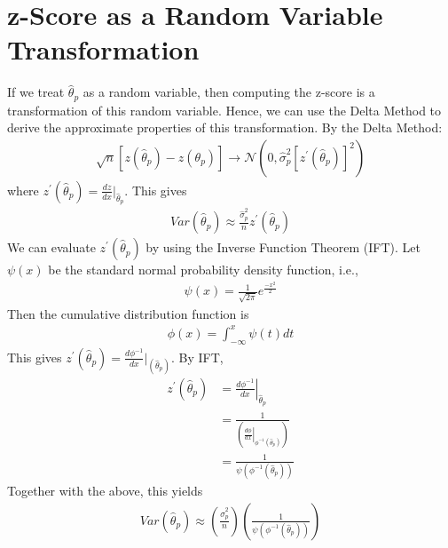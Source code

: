 \documentclass[12pt]{article}
\begin{document}
\section{z-Score as a Random Variable Transformation}
If we treat $\hat{\theta}_p$ as a random variable, then computing the z-score is a transformation of this random variable. Hence, we can use the Delta Method to derive the approximate properties of this transformation. By the Delta Method:
\begin{align*}
    \sqrt{n}\left[ z(\hat{\theta}_p) - z(\theta_p) \right] \rightarrow \mathcal{N}\left( 0, \hat{\sigma}_p^2 [z^\prime(\hat{\theta}_p)]^2 \right)
\end{align*}
where $z^\prime(\hat{\theta}_p)=\frac{dz}{dx}|_{\hat{\theta}_p}$. This gives
\begin{align*}
    Var(\hat{\theta}_p) \approx \frac{\hat{\sigma}_p^2}{n} z^\prime(\hat{\theta}_p)
\end{align*}
We can evaluate $z^\prime(\hat{\theta}_p)$ by using the Inverse Function Theorem (IFT). Let $\psi(x)$ be the standard normal probability density function, i.e.,
\begin{align*}
    \psi(x) = \frac{1}{\sqrt{2\pi}}e^{\frac{-x^2}{2}}
\end{align*}
Then the cumulative distribution function is
\begin{align*}
    \phi(x) = \int_{-\infty}^x \psi(t)dt
\end{align*}
This gives $z^\prime(\hat{\theta}_p) = \frac{d\phi^{-1}}{dx}|_{(\hat{\theta}_p)}$. By IFT,
\begin{align*}
    z^\prime(\hat{\theta}_p) &=\left. \frac{d\phi^{-1}}{dx}\right|_{\hat{\theta}_p} \\
    &= \frac{1}{\left( \left. \frac{d\phi}{dx} \right|_{\phi^{-1}(\hat{\theta}_p)} \right)} \\
    &= \frac{1}{\psi(\phi^{-1}(\hat{\theta}_p))}
\end{align*}
Together with the above, this yields
\begin{align*}
    Var(\hat{\theta}_p) \approx \left(\frac{\hat{\sigma}_p^2}{n}\right) \left(\frac{1}{\psi(\phi^{-1}(\hat{\theta}_p))}\right)
\end{align*}
\end{document}
